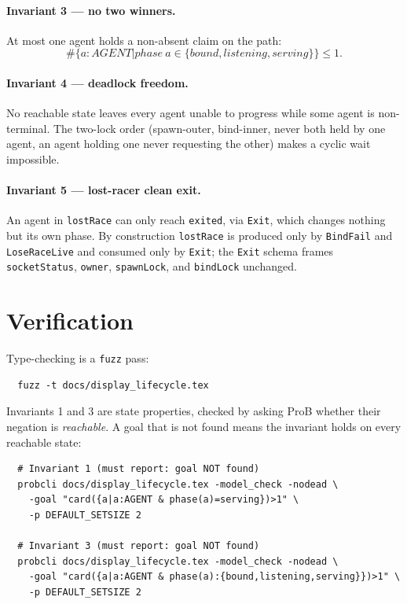 \documentclass[a4paper,10pt,fleqn]{article}
\begin{document}
\paragraph{Invariant 3 --- no two winners.}
At most one agent holds a non-absent claim on the path:
\[
  \# \{ a : AGENT | phase~a \in \{ bound, listening, serving \} \}
    \leq 1.
\]

\paragraph{Invariant 4 --- deadlock freedom.}
No reachable state leaves every agent unable to progress while some agent
is non-terminal.  The two-lock order (spawn-outer, bind-inner, never both
held by one agent, an agent holding one never requesting the other) makes
a cyclic wait impossible.

\paragraph{Invariant 5 --- lost-racer clean exit.}
An agent in \texttt{lostRace} can only reach \texttt{exited}, via
\texttt{Exit}, which changes nothing but its own phase.  By construction
\texttt{lostRace} is produced only by \texttt{BindFail} and
\texttt{LoseRaceLive} and consumed only by \texttt{Exit}; the \texttt{Exit}
schema frames \texttt{socketStatus}, \texttt{owner}, \texttt{spawnLock},
and \texttt{bindLock} unchanged.

\section{Verification}
\label{sec:verify}

Type-checking is a \texttt{fuzz} pass:
\begin{verbatim}
  fuzz -t docs/display_lifecycle.tex
\end{verbatim}

Invariants 1 and 3 are state properties, checked by asking ProB whether
their negation is \emph{reachable}.  A goal that is not found means the
invariant holds on every reachable state:
\begin{verbatim}
  # Invariant 1 (must report: goal NOT found)
  probcli docs/display_lifecycle.tex -model_check -nodead \
    -goal "card({a|a:AGENT & phase(a)=serving})>1" \
    -p DEFAULT_SETSIZE 2

  # Invariant 3 (must report: goal NOT found)
  probcli docs/display_lifecycle.tex -model_check -nodead \
    -goal "card({a|a:AGENT & phase(a):{bound,listening,serving}})>1" \
    -p DEFAULT_SETSIZE 2
\end{verbatim}
\end{document}
